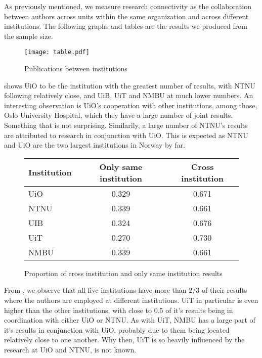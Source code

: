 As previously mentioned, we measure research connectivity as the collaboration between authors across units within the same organization and across different institutions. The following graphs and tables are the results we produced from the sample size.

\begin{figure}[h]
  \centering
  \texttt{[image: table.pdf]}
  \caption{Publications between institutions}
  \label{fig:result}
\end{figure}

 shows UiO to be the institution with the greatest number of results, with NTNU following relatively close, and UiB, UiT and NMBU at much lower numbers.
An interesting observation is UiO’s cooperation with other institutions, among those, Oslo University Hospital, which they have a large number of joint results. Something that is not surprising.
Similarily, a large number of NTNU’s results are attributed to research in conjunction with UiO. This is expected as NTNU and UiO are the two largest institutions in Norway by far.


\begin{figure}[h]
	\centering
	\begin{tabular}{| l || c | c |}
		\hline
		Institution	& Only same institution	& Cross institution	\\ \hline
		UiO		& 0.329			& 0.671			\\
		NTNU		& 0.339			& 0.661			\\
		UIB		& 0.324			& 0.676			\\
		UiT		& 0.270			& 0.730			\\
		NMBU		& 0.339			& 0.661			\\
		\hline
	\end{tabular}
	\caption{Proportion of cross institution and only same institution results}
	\label{tab:institution-proportion}
\end{figure}

From , we observe that all five institutions have more than $2/3$ of their results where the authors are employed at different institutions. UiT in particular is even higher than the other institutions, with close to 0.5 of it’s results being in coordination with either UiO or NTNU. As with UiT, NMBU has a large part of it’s results in conjunction with UiO, probably due to them being located relatively close to one another. Why then, UiT is so heavily influenced by the research at UiO and NTNU, is not known.


